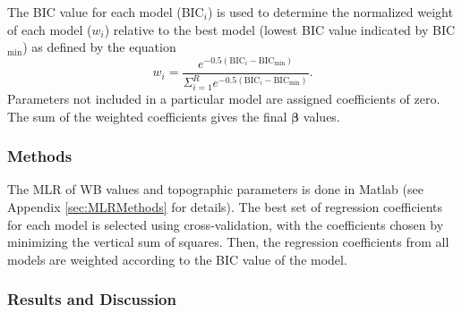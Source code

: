 \documentclass{sfuthesis}
\begin{document}
The BIC value for each model (BIC$_i$) is used to determine the normalized weight of each model ($w_i$) relative to the best model (lowest BIC value indicated by BIC$_{\min}$) as defined by the equation \citep{Burnham2004}
\begin{equation}
w_i = \frac{e^{-0.5(\mathrm{BIC}_i-\mathrm{BIC}_{\min})}}{\Sigma_{i=1}^R e^{-0.5(\mathrm{BIC}_i-\mathrm{BIC}_{\min})}}.
\label{eq:BIC}
\end{equation}
Parameters not included in a particular model are assigned coefficients of zero. The sum of the weighted coefficients gives the final $\bm{\beta}$ values.

\subsubsection{Methods}

The MLR of WB values and topographic parameters is done in Matlab (see Appendix \ref{sec:MLRMethods} for details). The best set of regression coefficients for each model is selected using cross-validation, with the coefficients chosen by minimizing the vertical sum of squares. Then, the regression coefficients from all models are weighted according to the BIC value of the model.

\subsubsection{Results and Discussion}
\end{document}
